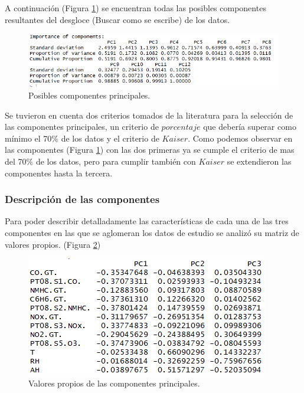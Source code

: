 \documentclass[a4paper,10pt,twocolumn]{article}
\begin{document}
  A continuación (Figura \ref{fig:acp1}) se encuentran todas las posibles componentes resultantes del desgloce (Buscar como se escribe) de los datos.
 
 \begin{figure}[htb]%
 	\begin{center}
 		\includegraphics[width=\linewidth]{Images/acp1.png}
 	\end{center}
 	\caption{Posibles componentes principales.}
 	\label{fig:acp1}
 \end{figure}

  Se tuvieron en cuenta dos criterios tomados de la literatura para la selección de las componentes principales, un criterio de $porcentaje$ que debería superar como mínimo el 70\% de los datos y el criterio de $Kaiser$. Como podemos observar en las componentes (Figura \ref{fig:acp1}) con las dos primeras ya se cumple el criterio de mas del 70\% de los datos, pero para cumplir también con $Kaiser$ se extendieron las componentes hasta la tercera.
  
  \subsubsection{Descripción de las componentes} \label{acp:description}
  
  Para poder describir detalladamente las características de cada una de las tres componentes en las que se aglomeran los datos de estudio se analizó su matriz de valores propios. (Figura \ref{fig:acp2})
  
  \begin{figure}[htb]%
  	\begin{center}
  		\includegraphics[width=\linewidth]{Images/acp2.png}
  	\end{center}
  	\caption{Valores propios de las componentes principales.}
  	\label{fig:acp2}
  \end{figure}
\end{document}
